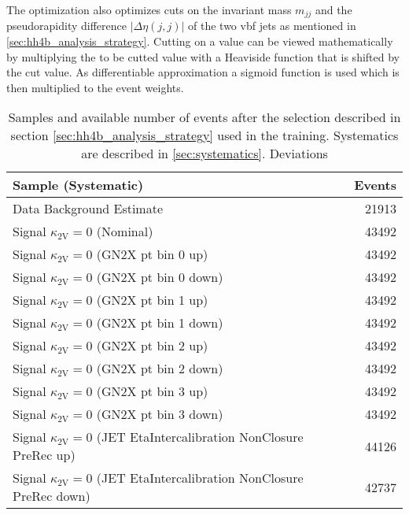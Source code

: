 The optimization also optimizes cuts on the invariant mass $m_{jj}$ and the pseudorapidity difference $|\Delta\eta(j,j)|$ of the two \ac{vbf} jets as mentioned in \ref{sec:hh4b_analysis_strategy}. Cutting on a value can be viewed mathematically by multiplying the to be cutted value with a Heaviside function that is shifted by the cut value. As differentiable approximation a sigmoid function is used which is then multiplied to the event weights.


\begin{table}[]
    \centering
    \caption{Samples and available number of events after the selection described in section \ref{sec:hh4b_analysis_strategy} used in the training. Systematics are described in \ref{sec:systematics}. Deviations }
    \begin{tabular}{lr}
        \hline
        Sample (Systematic)                                                            & Events \\ \hline \hline
        Data Background Estimate                                                       & 21913  \\ \hline
        Signal $\kappa_\mathrm{2V}=0$ (Nominal)                                        & 43492  \\
        Signal $\kappa_\mathrm{2V}=0$ (GN2X pt bin 0 up)                               & 43492  \\
        Signal $\kappa_\mathrm{2V}=0$ (GN2X pt bin 0 down)                             & 43492  \\
        Signal $\kappa_\mathrm{2V}=0$ (GN2X pt bin 1 up)                               & 43492  \\
        Signal $\kappa_\mathrm{2V}=0$ (GN2X pt bin 1 down)                             & 43492  \\
        Signal $\kappa_\mathrm{2V}=0$ (GN2X pt bin 2 up)                               & 43492  \\
        Signal $\kappa_\mathrm{2V}=0$ (GN2X pt bin 2 down)                             & 43492  \\
        Signal $\kappa_\mathrm{2V}=0$ (GN2X pt bin 3 up)                               & 43492  \\
        Signal $\kappa_\mathrm{2V}=0$ (GN2X pt bin 3 down)                             & 43492  \\
        Signal $\kappa_\mathrm{2V}=0$ (JET EtaIntercalibration NonClosure PreRec up)   & 44126  \\
        Signal $\kappa_\mathrm{2V}=0$ (JET EtaIntercalibration NonClosure PreRec down) & 42737  \\

\end{tabular}
\end{table}
